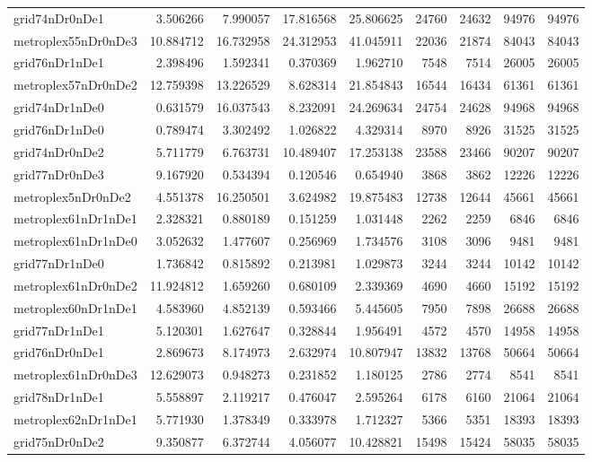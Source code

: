 \begin{longtable}{|l|r|r|r|r|r|r|r|r|}
grid74nDr0nDe1 & 3.506266 & 7.990057 & 17.816568 & 25.806625 & 24760 & 24632 & 94976 & 94976 \\
metroplex55nDr0nDe3 & 10.884712 & 16.732958 & 24.312953 & 41.045911 & 22036 & 21874 & 84043 & 84043 \\
grid76nDr1nDe1 & 2.398496 & 1.592341 & 0.370369 & 1.962710 & 7548 & 7514 & 26005 & 26005 \\
metroplex57nDr0nDe2 & 12.759398 & 13.226529 & 8.628314 & 21.854843 & 16544 & 16434 & 61361 & 61361 \\
grid74nDr1nDe0 & 0.631579 & 16.037543 & 8.232091 & 24.269634 & 24754 & 24628 & 94968 & 94968 \\
grid76nDr1nDe0 & 0.789474 & 3.302492 & 1.026822 & 4.329314 & 8970 & 8926 & 31525 & 31525 \\
grid74nDr0nDe2 & 5.711779 & 6.763731 & 10.489407 & 17.253138 & 23588 & 23466 & 90207 & 90207 \\
grid77nDr0nDe3 & 9.167920 & 0.534394 & 0.120546 & 0.654940 & 3868 & 3862 & 12226 & 12226 \\
metroplex5nDr0nDe2 & 4.551378 & 16.250501 & 3.624982 & 19.875483 & 12738 & 12644 & 45661 & 45661 \\
metroplex61nDr1nDe1 & 2.328321 & 0.880189 & 0.151259 & 1.031448 & 2262 & 2259 & 6846 & 6846 \\
metroplex61nDr1nDe0 & 3.052632 & 1.477607 & 0.256969 & 1.734576 & 3108 & 3096 & 9481 & 9481 \\
grid77nDr1nDe0 & 1.736842 & 0.815892 & 0.213981 & 1.029873 & 3244 & 3244 & 10142 & 10142 \\
metroplex61nDr0nDe2 & 11.924812 & 1.659260 & 0.680109 & 2.339369 & 4690 & 4660 & 15192 & 15192 \\
metroplex60nDr1nDe1 & 4.583960 & 4.852139 & 0.593466 & 5.445605 & 7950 & 7898 & 26688 & 26688 \\
grid77nDr1nDe1 & 5.120301 & 1.627647 & 0.328844 & 1.956491 & 4572 & 4570 & 14958 & 14958 \\
grid76nDr0nDe1 & 2.869673 & 8.174973 & 2.632974 & 10.807947 & 13832 & 13768 & 50664 & 50664 \\
metroplex61nDr0nDe3 & 12.629073 & 0.948273 & 0.231852 & 1.180125 & 2786 & 2774 & 8541 & 8541 \\
grid78nDr1nDe1 & 5.558897 & 2.119217 & 0.476047 & 2.595264 & 6178 & 6160 & 21064 & 21064 \\
metroplex62nDr1nDe1 & 5.771930 & 1.378349 & 0.333978 & 1.712327 & 5366 & 5351 & 18393 & 18393 \\
grid75nDr0nDe2 & 9.350877 & 6.372744 & 4.056077 & 10.428821 & 15498 & 15424 & 58035 & 58035 \\

\end{longtable}
